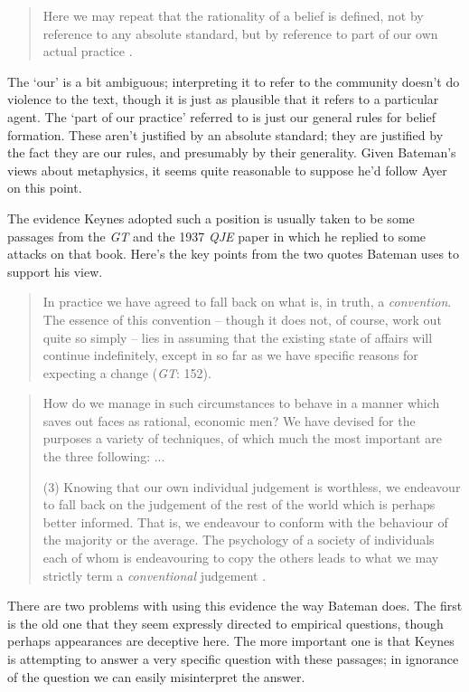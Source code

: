 \begin{quote}
Here we may repeat that the rationality of a belief is defined, not by reference to any absolute standard, but by reference to part of our own actual practice \cite[101]{Ayer1936}.
\end{quote}

\noindent The `our' is a bit ambiguous; interpreting it to refer to the community doesn't do violence to the text, though it is just as plausible that it refers to a particular agent. The `part of our practice' referred to is just our general rules for belief formation. These aren't justified by an absolute standard; they are justified by the fact they are our rules, and presumably by their generality. Given Bateman's views about metaphysics, it seems quite reasonable to suppose he'd follow Ayer on this point.

The evidence Keynes adopted such a position is usually taken to be some passages from the \textit{GT} and the 1937 \textit{QJE} paper in which he replied to some attacks on that book. Here's the key points from the two quotes Bateman uses to support his view.

\begin{quote}
In practice we have agreed to fall back on what is, in truth, a \textit{convention}. The essence of this convention -- though it does not, of course, work out quite so simply -- lies in assuming that the existing state of affairs will continue indefinitely, except in so far as we have specific reasons for expecting a change (\textit{GT}: 152).
\end{quote}

\medskip

\begin{quote}
How do we manage in such circumstances to behave in a manner which saves out faces as rational, economic men? We have devised for the purposes a variety of techniques, of which much the most important are the three following: ... 

(3) Knowing that our own individual judgement is worthless, we endeavour to fall back on the judgement of the rest of the world which is perhaps better informed. That is, we endeavour to conform with the behaviour of the majority or the average. The psychology of a society of individuals each of whom is endeavouring to copy the others leads to what we may strictly term a \textit{conventional} judgement \cite[115]{Keynes1937}.
\end{quote}

\noindent There are two problems with using this evidence the way Bateman does. The first is the old one that they seem expressly directed to empirical questions, though perhaps appearances are deceptive here. The more important one is that Keynes is attempting to answer a very specific question with these passages; in ignorance of the question we can easily misinterpret the answer.

